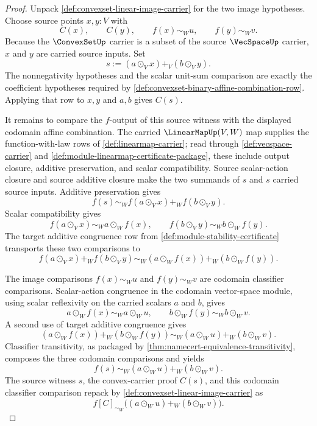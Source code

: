 \begin{proof}
Unpack \autoref{def:convexset-linear-image-carrier} for the two image hypotheses. Choose source points $x,y:V$ with
$$
C(x),\qquad C(y),\qquad f(x)\sim_Wu,\qquad f(y)\sim_Wv.
$$
Because the $\ConvexSetUp$ carrier is a subset of the source $\VecSpaceUp$ carrier, $x$ and $y$ are carried source inputs. Set
$$
s:=(a\odot_V x)+_V(b\odot_V y).
$$
The nonnegativity hypotheses and the scalar unit-sum comparison are exactly the coefficient hypotheses required by \autoref{def:convexset-binary-affine-combination-row}. Applying that row to $x,y$ and $a,b$ gives $C(s)$.

It remains to compare the $f$-output of this source witness with the displayed codomain affine combination. The carried $\LinearMapUp(V,W)$ map supplies the function-with-law rows of \autoref{def:linearmap-carrier}; read through \autoref{def:vecspace-carrier} and \autoref{def:module-linearmap-certificate-package}, these include output closure, additive preservation, and scalar compatibility. Source scalar-action closure and source additive closure make the two summands of $s$ and $s$ carried source inputs. Additive preservation gives
$$
f(s)\sim_W f(a\odot_V x)+_W f(b\odot_V y).
$$
Scalar compatibility gives
$$
f(a\odot_V x)\sim_W a\odot_W f(x),
\qquad
f(b\odot_V y)\sim_W b\odot_W f(y).
$$
The target additive congruence row from \autoref{def:module-stability-certificate} transports these two comparisons to
$$
f(a\odot_V x)+_W f(b\odot_V y)
\sim_W
(a\odot_W f(x))+_W(b\odot_W f(y)).
$$

The image comparisons $f(x)\sim_Wu$ and $f(y)\sim_Wv$ are codomain classifier comparisons. Scalar-action congruence in the codomain vector-space module, using scalar reflexivity on the carried scalars $a$ and $b$, gives
$$
a\odot_W f(x)\sim_W a\odot_W u,
\qquad
b\odot_W f(y)\sim_W b\odot_W v.
$$
A second use of target additive congruence gives
$$
(a\odot_W f(x))+_W(b\odot_W f(y))
\sim_W
(a\odot_W u)+_W(b\odot_W v).
$$
Classifier transitivity, as packaged by \autoref{thm:namecert-equivalence-transitivity}, composes the three codomain comparisons and yields
$$
f(s)\sim_W(a\odot_W u)+_W(b\odot_W v).
$$
The source witness $s$, the convex-carrier proof $C(s)$, and this codomain classifier comparison repack by \autoref{def:convexset-linear-image-carrier} as
$$
f[C]_{\sim_W}\bigl((a\odot_W u)+_W(b\odot_W v)\bigr).
$$
\end{proof}

